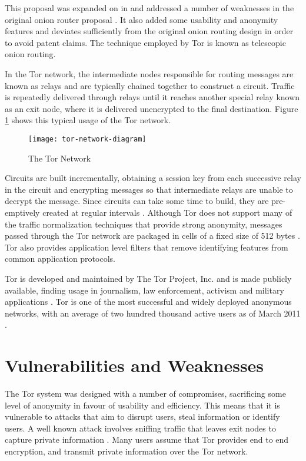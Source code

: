 \documentclass{ecuthesis}
\begin{document}
This proposal was expanded on in  and addressed a
number of weaknesses in the original onion router proposal
\parencite{Dingledine:2004p314}. It also added some usability and anonymity
features and deviates sufficiently from the original onion routing design in
order to avoid patent claims. The technique employed by Tor is known as
telescopic onion routing.

In the Tor network, the intermediate nodes responsible for routing messages are
known as relays and are typically chained together to construct a circuit.
Traffic is repeatedly delivered through relays until it reaches another special
relay known as an exit node, where it is delivered unencrypted to the final
destination.  Figure \ref{tor-network} shows this typical usage of the Tor
network.

\begin{figure}[H]
  \centering\texttt{[image: tor-network-diagram]}
  \caption{The Tor Network}
  \label{tor-network}
\end{figure}

Circuits are built incrementally, obtaining a session key from each
successive relay in the circuit and encrypting messages so that intermediate
relays are unable to decrypt the message. Since circuits can take some time to
build, they are pre-emptively created at regular intervals
\parencite[5]{Dingledine:2004p314}. Although Tor does not support many of the
traffic normalization techniques that provide strong anonymity, messages passed
through the Tor network are packaged in cells of a fixed size of 512 bytes
\parencite[5]{Dingledine:2004p314}. Tor also provides application level filters
that remove identifying features from common application protocols.

Tor is developed and maintained  by The Tor Project, Inc. and is made publicly
available, finding usage in journalism, law enforcement, activism and military
applications \parencite{The-Tor-Project-Inc.:2011uq}. Tor is one of the most
successful and widely deployed anonymous networks, with an average of two
hundred thousand active users as of March 2011
\parencite{The-Tor-Project-Inc.:2011fk}.

\section{Vulnerabilities and Weaknesses}

The Tor system was designed with a number of compromises, sacrificing some level
of anonymity in favour of usability and efficiency. This means that it is
vulnerable to attacks that aim to disrupt users, steal information or identify
users. A well known attack involves sniffing traffic that leaves exit nodes to
capture private information \parencite{website:tor-password-leak}. Many users
assume that Tor provides end to end encryption, and transmit private information
over the Tor network.
\end{document}
